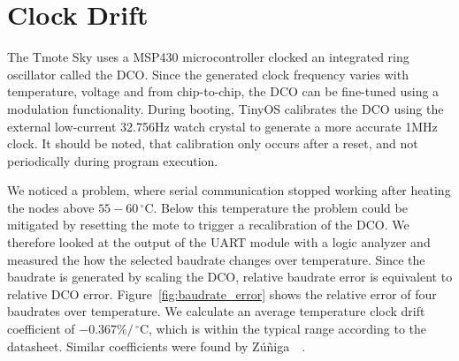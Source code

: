 \section{Clock Drift}

The Tmote Sky uses a MSP430 microcontroller clocked an integrated ring oscillator called the \ac{DCO}.
Since the generated clock frequency varies with temperature, voltage and from chip-to-chip, the \ac{DCO} can be fine-tuned using a modulation functionality.
During booting, TinyOS calibrates the \ac{DCO} using the external low-current 32.756Hz watch crystal to generate a more accurate 1MHz clock.
It should be noted, that calibration only occurs after a reset, and not periodically during program execution.

We noticed a problem, where serial communication stopped working after heating the nodes above $55-60\,^{\circ}\mathrm{C}$. Below this temperature the problem could be mitigated by resetting the mote to trigger a recalibration of the \ac{DCO}.
We therefore looked at the output of the \ac{UART} module with a logic analyzer and measured the how the selected baudrate changes over temperature.
Since the baudrate is generated by scaling the \ac{DCO}, relative baudrate error is equivalent to relative \ac{DCO} error.
Figure~\ref{fig:baudrate_error} shows the relative error of four baudrates over temperature.
We calculate an average temperature clock drift coefficient of $-0.367\%/\,^{\circ}\mathrm{C}$, which is within the typical range according to the datasheet. Similar coefficients were found by Z{\'u}{\~n}iga~\etal~\cite{Zuniga2013}.

